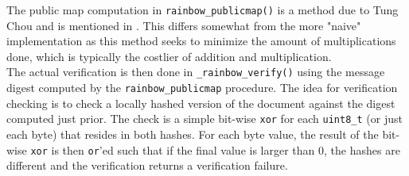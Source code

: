 The public map computation in \texttt{rainbow\_publicmap()} is a method due to Tung Chou and is mentioned in \cite{rainbownist}. This differs somewhat from the more "naive" implementation as this method seeks to minimize the amount of multiplications done, which is typically the costlier of addition and multiplication.\medskip\\
The actual verification is then done in \texttt{\_rainbow\_verify()} using the message digest computed by the \texttt{rainbow\_publicmap} procedure. The idea for verification checking is to check a locally hashed version of the document against the digest computed just prior. The check is a simple bit-wise \texttt{xor} for each \texttt{uint8\_t} (or just each byte) that resides in both hashes. For each byte value, the result of the bit-wise \texttt{xor} is then \texttt{or}'ed such that if the final value is larger than 0, the hashes are different and the verification returns a verification failure.

